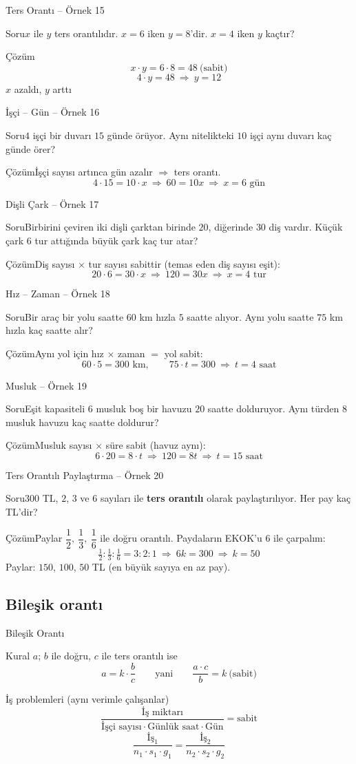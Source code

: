 \documentclass[aspectratio=169,11pt,handout]{beamer}
\newcommand{\soru}[3]{%
\begin{frame}{#1}
  \begin{block}{Soru}\large #2\end{block}
  \pause
  \begin{exampleblock}{Çözüm}\large #3\end{exampleblock}
\end{frame}}
\begin{document}
\soru{Ters Orantı -- Örnek 15}
{\(x\) ile \(y\) ters orantılıdır. \(x=6\) iken \(y=8\)'dir. \(x=4\) iken \(y\) kaçtır?}
{\[x\cdot y=6\cdot 8=48\ \text{(sabit)}\]
\[4\cdot y=48\ \Rightarrow\ y=12\]
\(x\) azaldı, \(y\) arttı \checkmark}

\soru{İşçi -- Gün -- Örnek 16}
{\(4\) işçi bir duvarı \(15\) günde örüyor. Aynı nitelikteki \(10\) işçi aynı duvarı kaç günde örer?}
{İşçi sayısı artınca gün azalır \(\Rightarrow\) ters orantı.
\[4\cdot 15=10\cdot x\ \Rightarrow\ 60=10x\ \Rightarrow\ x=6\text{ gün}\]}

\soru{Dişli Çark -- Örnek 17}
{Birbirini çeviren iki dişli çarktan birinde \(20\), diğerinde \(30\) diş vardır. Küçük çark \(6\) tur attığında büyük çark kaç tur atar?}
{Diş sayısı \(\times\) tur sayısı sabittir (temas eden diş sayısı eşit):
\[20\cdot 6=30\cdot x\ \Rightarrow\ 120=30x\ \Rightarrow\ x=4\text{ tur}\]}

\soru{Hız -- Zaman -- Örnek 18}
{Bir araç bir yolu saatte \(60\) km hızla \(5\) saatte alıyor. Aynı yolu saatte \(75\) km hızla kaç saatte alır?}
{Aynı yol için hız \(\times\) zaman \(=\) yol sabit:
\[60\cdot 5=300\text{ km},\qquad 75\cdot t=300\ \Rightarrow\ t=4\text{ saat}\]}

\soru{Musluk -- Örnek 19}
{Eşit kapasiteli \(6\) musluk boş bir havuzu \(20\) saatte dolduruyor. Aynı türden \(8\) musluk havuzu kaç saatte doldurur?}
{Musluk sayısı \(\times\) süre sabit (havuz aynı):
\[6\cdot 20=8\cdot t\ \Rightarrow\ 120=8t\ \Rightarrow\ t=15\text{ saat}\]}

\soru{Ters Orantılı Paylaştırma -- Örnek 20}
{\(300\) TL, \(2\), \(3\) ve \(6\) sayıları ile \textbf{ters orantılı} olarak paylaştırılıyor. Her pay kaç TL'dir?}
{Paylar \(\dfrac{1}{2},\ \dfrac{1}{3},\ \dfrac{1}{6}\) ile doğru orantılı. Paydaların EKOK'u \(6\) ile çarpalım:
\[\tfrac{1}{2}:\tfrac{1}{3}:\tfrac{1}{6}=3:2:1\ \Rightarrow\ 6k=300\ \Rightarrow\ k=50\]
Paylar: \(150\), \(100\), \(50\) TL (en büyük sayıya en az pay).}

\subsection{Bileşik orantı}
\begin{frame}{Bileşik Orantı}
\begin{block}{Kural}
\(a\); \(b\) ile doğru, \(c\) ile ters orantılı ise
\[a=k\cdot\frac{b}{c}\qquad\text{yani}\qquad \frac{a\cdot c}{b}=k\ \text{(sabit)}\]
\end{block}
\begin{block}{İş problemleri (aynı verimle çalışanlar)}
\[\frac{\text{İş miktarı}}{\text{İşçi sayısı}\cdot\text{Günlük saat}\cdot\text{Gün}}=\text{sabit}\]
\[\frac{\text{İş}_1}{n_1\cdot s_1\cdot g_1}=\frac{\text{İş}_2}{n_2\cdot s_2\cdot g_2}\]
\end{block}
\end{frame}
\end{document}
